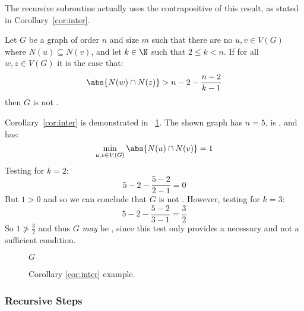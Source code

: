The recursive subroutine actually uses the contrapositive of this result, as stated in Corollary~\ref{cor:inter}.

\begin{corollary}
  \label{cor:inter}
  Let \(G\) be a graph of order \(n\) and size \(m\) such that there are no \(u,v\in V(G)\) where
  \(N(u)\subseteq N(v)\), and let \(k\in\N\) such that \(2\le k<n\).  If for all \(w,z\in V(G)\) it is the case
  that:
  \[\abs{N(w)\cap N(z)}>n-2-\frac{n-2}{k-1}\]
  then \(G\) is not .
\end{corollary}

Corollary~\ref{cor:inter} is demonstrated in \figurename~\ref{fig:inter}.  The shown graph has \(n=5\), is
, and has:
\[\min_{u,v\in V(G)}\abs{N(u)\cap N(v)}=1\]
Testing for \(k=2\):
\[5-2-\frac{5-2}{2-1}=0\]
But \(1>0\) and so we can conclude that \(G\) is not .  However, testing for \(k=3\):
\[5-2-\frac{5-2}{3-1}=\frac{3}{2}\]
So \(1\ngtr\frac{3}{2}\) and thus \(G\) \emph{may} be , since this test only provides a necessary and
not a sufficient condition.

\begin{figure}[H]
  \centering

  \(G\)
  \caption{Corollary \ref{cor:inter} example.}
  \label{fig:inter}
\end{figure}

\subsubsection{Recursive Steps}

